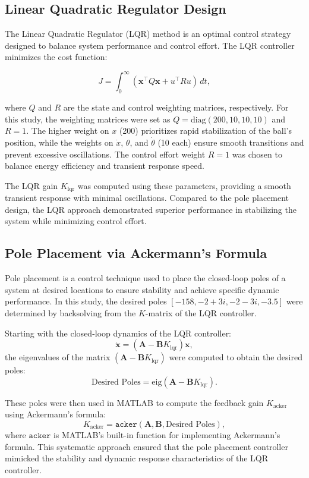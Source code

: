 \documentclass[conference]{IEEEtran}
\begin{document}
\subsection{Linear Quadratic Regulator Design}
\label{subsec:lqr_design}
The Linear Quadratic Regulator (LQR) method is an optimal control strategy designed to balance system performance and control effort. The LQR controller minimizes the cost function:

\begin{equation}
    J = \int_{0}^{\infty} (\mathbf{x}^\top Q \mathbf{x} + u^\top R u) \, dt,
\end{equation}

where \(Q\) and \(R\) are the state and control weighting matrices, respectively. For this study, the weighting matrices were set as \( Q = \text{diag}(200, 10, 10, 10) \) and \( R = 1 \). The higher weight on \(x\) (200) prioritizes rapid stabilization of the ball's position, while the weights on \(\dot{x}\), \(\theta\), and \(\dot{\theta}\) (10 each) ensure smooth transitions and prevent excessive oscillations. The control effort weight \(R = 1\) was chosen to balance energy efficiency and transient response speed.

The LQR gain \(K_{\text{lqr}}\) was computed using these parameters, providing a smooth transient response with minimal oscillations. Compared to the pole placement design, the LQR approach demonstrated superior performance in stabilizing the system while minimizing control effort.

\subsection{Pole Placement via Ackermann's Formula}
\label{subsec:control_pp_v_acker}
Pole placement is a control technique used to place the closed-loop poles of a system at desired locations to ensure stability and achieve specific dynamic performance. In this study, the desired poles \([-158, -2+3i, -2-3i, -3.5]\) were determined by backsolving from the \(K\)-matrix of the LQR controller.

Starting with the closed-loop dynamics of the LQR controller:
\[
\dot{\mathbf{x}} = (\mathbf{A} - \mathbf{B} K_{\text{lqr}}) \mathbf{x},
\]
the eigenvalues of the matrix \((\mathbf{A} - \mathbf{B} K_{\text{lqr}})\) were computed to obtain the desired poles:
\[
\text{Desired Poles} = \text{eig}(\mathbf{A} - \mathbf{B} K_{\text{lqr}}).
\]

These poles were then used in MATLAB to compute the feedback gain \(K_{\text{acker}}\) using Ackermann’s formula:
\[
K_{\text{acker}} = \texttt{acker}(\mathbf{A}, \mathbf{B}, \text{Desired Poles}),
\]
where \(\texttt{acker}\) is MATLAB's built-in function for implementing Ackermann’s formula. This systematic approach ensured that the pole placement controller mimicked the stability and dynamic response characteristics of the LQR controller.
\end{document}
